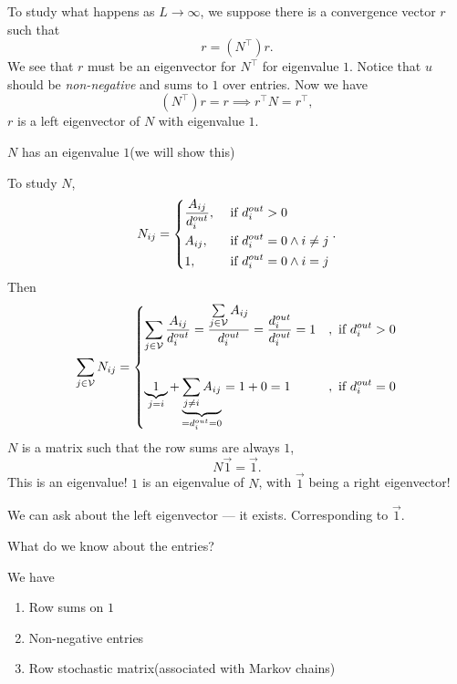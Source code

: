 To study what happens as \(L\to \infty\), we suppose there is a convergence vector \(r\) such that
\[
	r = (N^{\top})r.
\]
We see that \(r\) must be an eigenvector for \(N^{\top}\) for eigenvalue \(1\). Notice that \(u\) should be
\emph{non-negative} and sums to \(1\) over entries. Now we have
\[
	(N^{\top})r = r \implies r^{\top}N = r^{\top},
\]
\(r\) is a left eigenvector of \(N\) with eigenvalue \(1\).
\begin{note}
	\(N\) has an eigenvalue \(1\)(we will show this)
\end{note}
To study \(N\),
\[
	N_{ij} = \begin{dcases}
		\frac{A_{ij}}{d_{i}^{out}}, & \text{ if }d_{i}^{out}>0               \\
		A_{ij},                     & \text{ if }d_{i}^{out}=0\land i\neq  j \\
		1,                          & \text{ if }d_{i}^{out}=0 \land i = j   \\
	\end{dcases}.
\]
Then
\[
	\sum\limits_{j\in\mathcal{V}}N_{ij} = \begin{dcases}
		\sum\limits_{j\in\mathcal{V}} \frac{A_{ij}}{d_{i}^{out}} = \frac{\sum\limits_{j\in\mathcal{V}} A_{ij} }{d_{i}^{out}} = \frac{d_{i}^{out}}{d_{i}^{out}}= 1 & , \text{ if }d_{i}^{out} > 0 \\\\
		\underbrace{1}_{j = i} + \underbrace{\sum\limits_{j\neq i} A_{ij}}_{ = d_{i}^{out} = 0} = 1 + 0 = 1                                                       & , \text{ if }d_{i}^{out} = 0 \\
	\end{dcases}
\]
\(N\) is a matrix such that the row sums are always \(1\),
\[
	N \vec{1} = \vec{1}.
\]
This is an eigenvalue! \(1\) is an eigenvalue of \(N\), with \(\vec{1}\) being a right eigenvector!

We can ask about the left eigenvector — it exists. Corresponding to \(\vec{1}\).
\begin{problem}
What do we know about the entries?
\end{problem}
\begin{answer}
	We have
	\begin{enumerate}
		\item Row sums on \(1\)
		\item Non-negative entries
		\item Row stochastic matrix(associated with Markov chains)
	\end{enumerate}
\end{answer}


